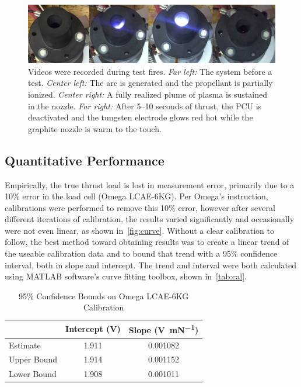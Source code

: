 \documentclass[conference]{IEEEtran}
\begin{document}
\begin{figure}
  \includegraphics[width=\linewidth]{figs/burnsnapshots.png}
  \caption{Videos were recorded during test fires.
  \emph{Far left:} The system before a test.
  \emph{Center left:} The arc is generated and the propellant is partially ionized.
  \emph{Center right:} A fully realized plume of plasma is sustained in the nozzle.
  \emph{Far right:} After 5--10 seconds of thrust, the PCU is deactivated and the tungsten electrode glows red hot while the graphite nozzle is warm to the touch.
\label{fig:burn-snapshots}}
\end{figure}

\subsection{Quantitative Performance}
Empirically, the true thrust load is lost in measurement error, primarily due to a 10\% error in the load cell (Omega LCAE-6KG).
Per Omega's instruction, calibrations were performed to remove this 10\% error, however after several different iterations of calibration, the results varied significantly and occasionally were not even linear, as shown in~\autoref{fig:curve}.
Without a clear calibration to follow, the best method toward obtaining results was to create a linear trend of the useable calibration data and to bound that trend with a 95\% confidence interval, both in slope and intercept.
The trend and interval were both calculated using MATLAB software's curve fitting toolbox, shown in~\autoref{tab:cal}.

\begin{table}
  \centering
  \caption{95\% Confidence Bounds on Omega LCAE-6KG Calibration
\label{tab:cal}}
  \begin{tabular}{lcc}
    \toprule
    & Intercept (\si{\volt}) & Slope (\si{\volt\per\milli\newton}) \\ \midrule
    Estimate & 1.911 & 0.001082 \\
    Upper Bound & 1.914 & 0.001152 \\
    Lower Bound & 1.908 & 0.001011 \\
    \bottomrule
  \end{tabular}
\end{table}
\end{document}
